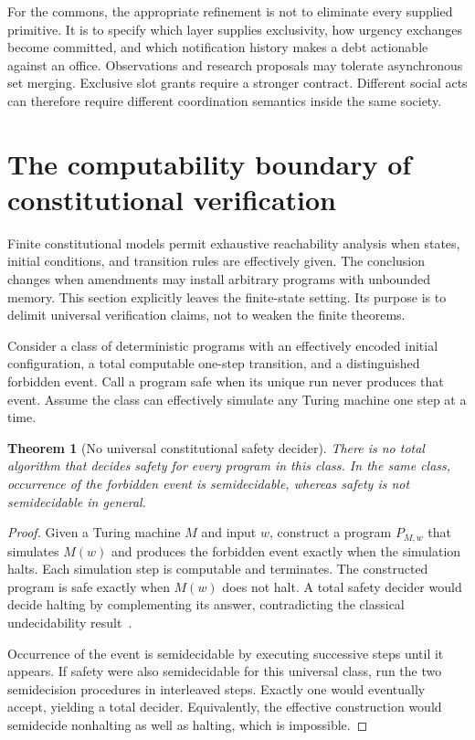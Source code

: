 \documentclass[11pt,letterpaper]{article}
\theoremstyle{plain}
\newtheorem{theorem}[proposition]{Theorem}
\theoremstyle{definition}
\theoremstyle{remark}
\begin{document}
For the commons, the appropriate refinement is not to eliminate every supplied primitive. It is to specify which layer supplies exclusivity, how urgency exchanges become committed, and which notification history makes a debt actionable against an office. Observations and research proposals may tolerate asynchronous set merging. Exclusive slot grants require a stronger contract. Different social acts can therefore require different coordination semantics inside the same society.


\section{The computability boundary of constitutional verification}\label{sec:computability}
Finite constitutional models permit exhaustive reachability analysis when states, initial conditions, and transition rules are effectively given. The conclusion changes when amendments may install arbitrary programs with unbounded memory. This section explicitly leaves the finite-state setting. Its purpose is to delimit universal verification claims, not to weaken the finite theorems.

Consider a class of deterministic programs with an effectively encoded initial configuration, a total computable one-step transition, and a distinguished forbidden event. Call a program safe when its unique run never produces that event. Assume the class can effectively simulate any Turing machine one step at a time.

\begin{theorem}[No universal constitutional safety decider]\label{thm:undecidable}
There is no total algorithm that decides safety for every program in this class. In the same class, occurrence of the forbidden event is semidecidable, whereas safety is not semidecidable in general.
\end{theorem}
\begin{proof}
Given a Turing machine $M$ and input $w$, construct a program $P_{M,w}$ that simulates $M(w)$ and produces the forbidden event exactly when the simulation halts. Each simulation step is computable and terminates. The constructed program is safe exactly when $M(w)$ does not halt. A total safety decider would decide halting by complementing its answer, contradicting the classical undecidability result~\cite{turing}.

Occurrence of the event is semidecidable by executing successive steps until it appears. If safety were also semidecidable for this universal class, run the two semidecision procedures in interleaved steps. Exactly one would eventually accept, yielding a total decider. Equivalently, the effective construction would semidecide nonhalting as well as halting, which is impossible.
\end{proof}
\end{document}
